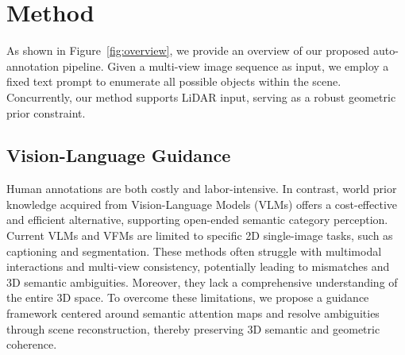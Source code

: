 


\section{Method}
\label{methodd}


As shown in Figure~\ref{fig:overview}, we provide an overview of our proposed auto-annotation pipeline. Given a multi-view image sequence as input, we employ a fixed text prompt to enumerate all possible objects within the scene. Concurrently, our method supports LiDAR input, serving as a robust geometric prior constraint.

\subsection{Vision-Language Guidance}
Human annotations are both costly and labor-intensive. In contrast, world prior knowledge acquired from Vision-Language Models (VLMs) offers a cost-effective and efficient alternative, supporting open-ended semantic category perception. Current VLMs and VFMs are limited to specific 2D single-image tasks, such as captioning and segmentation.
%
These methods often struggle with multimodal interactions and multi-view consistency, potentially leading to mismatches and 3D semantic ambiguities. Moreover, they lack a comprehensive understanding of the entire 3D space. To overcome these limitations, we propose a guidance framework centered around semantic attention maps and resolve ambiguities through scene reconstruction, thereby preserving 3D semantic and geometric coherence.


